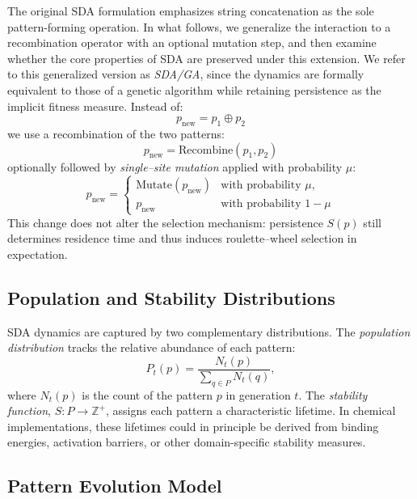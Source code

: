 \documentclass[life,article,submit,pdftex,moreauthors]{Definitions/mdpi}
\begin{document}
The original SDA formulation emphasizes string concatenation as the sole
pattern-forming operation. In what follows, we generalize the interaction 
to a recombination operator with an optional mutation step, and then examine 
whether the core properties of SDA are preserved under this extension. 
We refer to this generalized version as \textit{SDA/GA}, since the dynamics 
are formally equivalent to those of a genetic algorithm while retaining 
persistence as the implicit fitness measure. Instead of:
\[
p_{\text{new}} = p_1 \oplus p_2
\]
we use a recombination of the two patterns:
\[
p_{\text{new}} = \mathrm{Recombine}(p_1, p_2)
\]
optionally followed by \emph{single–site mutation} applied with probability $\mu$:
\[
p_{\text{new}} =
\begin{cases}
\mathrm{Mutate}(p_{\text{new}}) & \text{with probability } \mu,\\
p_{\text{new}} & \text{with probability } 1-\mu
\end{cases}
\]
This change does not alter the selection mechanism: persistence $S(p)$ still 
determines residence time and thus induces roulette–wheel selection in expectation.


\subsection{Population and Stability Distributions}

SDA dynamics are captured by two complementary distributions. 
The \textit{population distribution} tracks the relative abundance of each pattern:
\begin{equation}
P_t(p) = \frac{N_t(p)}{\sum_{q \in P} N_t(q)},
\end{equation}
where $N_t(p)$ is the count of the pattern $p$ in generation $t$. 
The \textit{stability function}, $S: P \rightarrow \mathbb{Z}^+$, assigns each pattern a characteristic lifetime. 
In chemical implementations, these lifetimes could in principle be derived from binding energies, activation barriers, or other domain-specific stability measures.

\subsection{Pattern Evolution Model}
\end{document}
